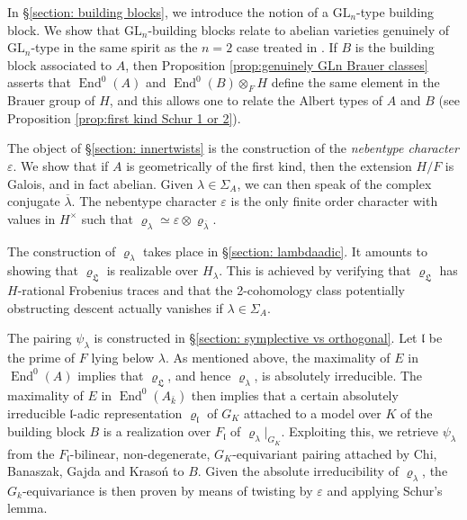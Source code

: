 \documentclass[oneside]{amsart}
\theoremstyle{remark}
\newcommand{\kbar}{{\bar{k}}}
\newcommand{\GL}{\mathrm{GL}}
\newcommand{\End}{\operatorname{End}}
\newcommand{\Ll}{\mathfrak{L}}
\newcommand{\gl}{\mathfrak{l}}
\numberwithin{equation}{section}
\begin{document}
In \S\ref{section: building blocks}, we introduce the notion of a $\GL_n$-type building block. We show that $\GL_n$-building blocks relate to abelian varieties genuinely of $\GL_n$-type in the same spirit as the $n=2$ case treated in \cite{Pyl04}. If $B$ is the building block associated to $A$, then Proposition \ref{prop:genuinely GLn Brauer classes} asserts that $\End^0(A)$ and $\End^0(B)\otimes_F H$ define the same element in the Brauer group of $H$, and this allows one to relate the Albert types of $A$ and $B$ (see Proposition \ref{prop:first kind Schur 1 or 2}).

The object of \S\ref{section: innertwists} is the construction of the \emph{nebentype character} $\varepsilon$. We show that if $A$ is geometrically of the first kind, then the extension $H/F$ is Galois, and in fact abelian. Given $\lambda \in \Sigma_A$, we can then speak of the complex conjugate $\overline \lambda$. The nebentype character $\varepsilon$ is the only finite order  character with values in $H^\times$ such that $\varrho_\lambda \simeq \varepsilon \otimes \varrho_{\overline \lambda}$.

The construction of $\varrho_\lambda$ takes place in \S\ref{section: lambdaadic}. It amounts to showing that $\varrho_{\Ll}$ is realizable over $H_\lambda$. This is achieved by verifying that $\varrho_{\Ll}$ has $H$-rational Frobenius traces and that the 2-cohomology class potentially obstructing descent actually vanishes if $\lambda \in \Sigma_A$.

The pairing $\psi_\lambda$ is constructed in \S\ref{section: symplective vs orthogonal}. Let $\gl$ be the prime of $F$ lying below $\lambda$. As mentioned above, the maximality of $E$ in $\End^0(A)$ implies that $\varrho_\Ll$, and hence $\varrho_\lambda$, is absolutely irreducible.  The maximality of $E$ in $\End^0(A_\kbar)$ then implies that a certain absolutely irreducible $\gl$-adic representation $\varrho_\gl$ of $G_K$ attached to a model over $K$ of the building block $B$ is a realization over $F_\gl$ of $\varrho_\lambda|_{G_K}$. Exploiting this, we retrieve $\psi_\lambda$ from the $F_\gl$-bilinear, non-degenerate, $G_K$-equivariant pairing attached by Chi, Banaszak, Gajda and Kraso\'n to $B$. Given the absolute irreducibility of $\varrho_\lambda$, the $G_k$-equivariance is then proven by means of twisting by $\varepsilon$ and applying Schur's lemma. 
\end{document}
